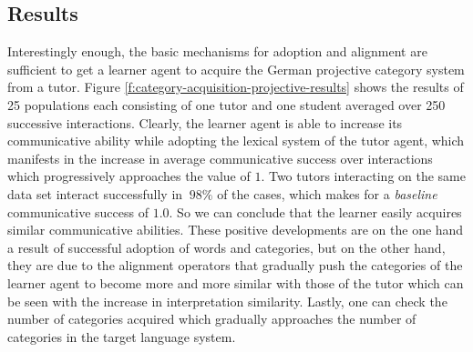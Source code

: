 \subsection{Results}
Interestingly enough, the basic mechanisms for adoption and alignment
are sufficient to get a learner agent to acquire the German projective category 
system from a tutor. Figure \ref{f:category-acquisition-projective-results}
shows the results of 25 populations each consisting of one tutor and one student
averaged over 250 successive interactions. Clearly, the learner agent is able to increase
its communicative ability while adopting the lexical system of the tutor agent,
which manifests in the increase in average communicative success
over interactions which progressively approaches the value of $1$. Two tutors 
interacting on the same data set interact successfully in $~98\%$ of the cases, which
makes for a \emph{baseline} communicative success of $1.0$. So we can conclude that
the learner easily acquires similar communicative abilities.
These positive developments are on the one hand a result of
successful adoption of words and categories, but on the other hand, they are due to
the alignment operators that gradually push the categories of the learner agent 
to become more and more similar with those of the tutor which can be seen with 
the increase in interpretation similarity. Lastly, one can check the number of categories acquired
which gradually approaches the number of categories in the target language system.

